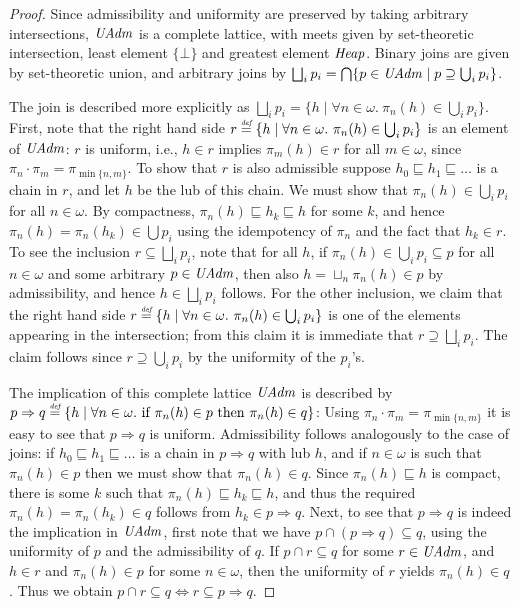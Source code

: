 \documentclass{LMCS}
\theoremstyle{remark}
\newcommand{\defeq}{\ensuremath{\stackrel{\mbox{\tiny \it def}}{=}}}
\newcommand{\IFF}{\ensuremath{\Leftrightarrow}}
\begin{document}
\begin{proof}
Since admissibility and uniformity are preserved by taking arbitrary intersections, $\mathit{UAdm}$ is a complete lattice, with meets given by set-theoretic intersection, least element $\{\bot\}$ and greatest element $\mathit{Heap}$. Binary joins are given by set-theoretic union, and arbitrary joins by $\bigsqcup_i p_i = \bigcap\{p \in \mathit{UAdm}\;|\;p\supseteq\bigcup_i p_i\}$.

The join is described more explicitly  as $\bigsqcup_i p_i = \{h\;|\;\forall n\in\omega.\ \pi_n(h)\in\bigcup_i p_i\}$. 
First, note that the  right hand side $r\defeq   \{h\;|\;\forall n\in\omega.\ \pi_n(h)\in\bigcup_i p_i\}$ is an element of $\mathit{UAdm}$: 
$r$ is uniform, i.e., $h\in r$ implies $\pi_m(h)\in r$ for all $m\in\omega$, since $\pi_n\cdot \pi_m = \pi_{\min\{n,m\}}$. To  show that $r$ is also admissible suppose $h_0\sqsubseteq h_1\sqsubseteq\ldots$ is a chain in $r$, and let $h$ be the lub of this chain. We must show that $\pi_n(h)\in \bigcup_i p_i$ for all $n\in\omega$. By compactness, $\pi_n(h)\sqsubseteq h_k\sqsubseteq h$ for some $k$, and hence $\pi_n(h) = \pi_n(h_k)\in\bigcup p_i$ using the idempotency of $\pi_n$ and the fact that $h_k\in r$. 
To see the inclusion $r\subseteq\bigsqcup_i p_i$, 
note that for all $h$, if $\pi_n(h)\in\bigcup_i p_i\subseteq p$ for all $n\in\omega$ and some arbitrary $p\in\mathit{UAdm}$, 
then also $h = \sqcup_n \pi_n(h) \in p$ by admissibility, and hence $h\in\bigsqcup_i p_i$ follows. 
For the other inclusion, we claim that the right hand side $r\defeq   \{h\;|\;\forall n\in\omega.\ \pi_n(h)\in\bigcup_i p_i\}$ is one of the elements appearing in the intersection; from this claim it is immediate that $r\supseteq\bigsqcup_i p_i$.  
The claim follows since $r\supseteq\bigcup_i p_i$ by the uniformity of the $p_i$'s.  

The implication  of this complete lattice $\mathit{UAdm}$ is described by  $p\Rightarrow q\defeq  \{h\;|\;\forall n\in\omega.\ \text{if $\pi_n(h)\in p$ then $\pi_n(h)\in q$} \}$: 
Using $\pi_n\cdot \pi_m = \pi_{\min\{n,m\}}$ it is easy to see that $p\Rightarrow q$ is uniform. Admissibility follows analogously to the case of joins: if $h_0\sqsubseteq h_1\sqsubseteq\ldots$ is a chain in $p\Rightarrow q$ with lub $h$, and if $n\in\omega$ is such that $\pi_n(h)\in p$ then we must show that $\pi_n(h)\in q$. Since $\pi_n(h)\sqsubseteq h$ is compact, there is some $k$ such that $\pi_n(h)\sqsubseteq h_k\sqsubseteq h$, and thus the required $\pi_n(h) = \pi_n(h_k)\in q$ follows from $h_k\in p\Rightarrow q$. 
Next, to see that $p\Rightarrow q$ is indeed the implication in $\mathit{UAdm}$, first note that we have $p\cap(p\Rightarrow q)\subseteq q$, using the uniformity of $p$ and the admissibility of $q$. If $p\cap r\subseteq q$ for some $r\in\mathit{UAdm}$, and $h\in r$ and $\pi_n(h)\in p$ for some $n\in\omega$, then the uniformity of $r$ yields $\pi_n(h)\in q$. Thus we obtain $p\cap r\subseteq q \IFF r\subseteq p\Rightarrow q$. 


\end{proof}
\end{document}
